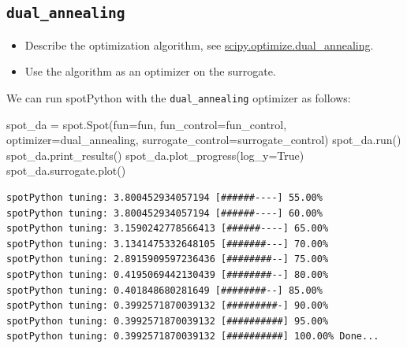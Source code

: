 \documentclass[
  letterpaper,
  DIV=11,
  numbers=noendperiod]{scrreprt}
\newenvironment{Shaded}{\begin{snugshade}}{\end{snugshade}}
\newcommand{\NormalTok}[1]{\textcolor[rgb]{0.00,0.23,0.31}{#1}}
\newcommand{\OperatorTok}[1]{\textcolor[rgb]{0.37,0.37,0.37}{#1}}
\newcommand{\VariableTok}[1]{\textcolor[rgb]{0.07,0.07,0.07}{#1}}
\providecommand{\tightlist}{%
  \setlength{\itemsep}{0pt}\setlength{\parskip}{0pt}}\usepackage{longtable,booktabs,array}
\begin{document}
\subsection{\texorpdfstring{\texttt{dual\_annealing}}{dual\_annealing}}\label{dual_annealing}

\begin{itemize}
\tightlist
\item
  Describe the optimization algorithm, see
  \href{https://docs.scipy.org/doc/scipy/reference/generated/scipy.optimize.dual_annealing.html}{scipy.optimize.dual\_annealing}.
\item
  Use the algorithm as an optimizer on the surrogate.
\end{itemize}

\begin{tcolorbox}[enhanced jigsaw, left=2mm, opacitybacktitle=0.6, leftrule=.75mm, toptitle=1mm, opacityback=0, colback=white, rightrule=.15mm, colframe=quarto-callout-tip-color-frame, title=\textcolor{quarto-callout-tip-color}{\faLightbulb}\hspace{0.5em}{Tip: Selecting the Optimizer for the Surrogate}, toprule=.15mm, coltitle=black, bottomrule=.15mm, bottomtitle=1mm, colbacktitle=quarto-callout-tip-color!10!white, titlerule=0mm, breakable, arc=.35mm]

We can run spotPython with the \texttt{dual\_annealing} optimizer as
follows:

\begin{Shaded}
\begin{Highlighting}[]
\NormalTok{spot\_da }\OperatorTok{=}\NormalTok{ spot.Spot(fun}\OperatorTok{=}\NormalTok{fun,}
\NormalTok{                    fun\_control}\OperatorTok{=}\NormalTok{fun\_control,}
\NormalTok{                    optimizer}\OperatorTok{=}\NormalTok{dual\_annealing,}
\NormalTok{                    surrogate\_control}\OperatorTok{=}\NormalTok{surrogate\_control)}
\NormalTok{spot\_da.run()}
\NormalTok{spot\_da.print\_results()}
\NormalTok{spot\_da.plot\_progress(log\_y}\OperatorTok{=}\VariableTok{True}\NormalTok{)}
\NormalTok{spot\_da.surrogate.plot()}
\end{Highlighting}
\end{Shaded}

\begin{verbatim}
spotPython tuning: 3.800452934057194 [######----] 55.00% 
spotPython tuning: 3.800452934057194 [######----] 60.00% 
spotPython tuning: 3.1590242778566413 [######----] 65.00% 
spotPython tuning: 3.1341475332648105 [#######---] 70.00% 
spotPython tuning: 2.8915909597236436 [########--] 75.00% 
spotPython tuning: 0.4195069442130439 [########--] 80.00% 
spotPython tuning: 0.401848680281649 [########--] 85.00% 
spotPython tuning: 0.3992571870039132 [#########-] 90.00% 
spotPython tuning: 0.3992571870039132 [##########] 95.00% 
spotPython tuning: 0.3992571870039132 [##########] 100.00% Done...


\end{verbatim}
\end{tcolorbox}
\end{document}

